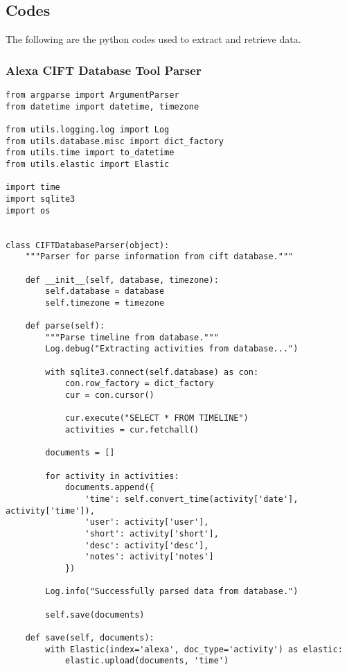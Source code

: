 \documentclass{easychair}
\begin{document}
\subsection{Codes}
The following are the python codes used to extract and retrieve data.
\subsubsection{Alexa CIFT Database Tool Parser}


\lstset{language=Python}
\lstset{frame=lines}
\lstset{basicstyle=\footnotesize}
\begin{lstlisting}
from argparse import ArgumentParser
from datetime import datetime, timezone

from utils.logging.log import Log
from utils.database.misc import dict_factory
from utils.time import to_datetime
from utils.elastic import Elastic

import time
import sqlite3
import os


class CIFTDatabaseParser(object):
    """Parser for parse information from cift database."""

    def __init__(self, database, timezone):
        self.database = database
        self.timezone = timezone

    def parse(self):
        """Parse timeline from database."""
        Log.debug("Extracting activities from database...")

        with sqlite3.connect(self.database) as con:
            con.row_factory = dict_factory
            cur = con.cursor()

            cur.execute("SELECT * FROM TIMELINE")
            activities = cur.fetchall()

        documents = []

        for activity in activities:
            documents.append({
                'time': self.convert_time(activity['date'], activity['time']),
                'user': activity['user'],
                'short': activity['short'],
                'desc': activity['desc'],
                'notes': activity['notes']
            })

        Log.info("Successfully parsed data from database.")

        self.save(documents)

    def save(self, documents):
        with Elastic(index='alexa', doc_type='activity') as elastic:
            elastic.upload(documents, 'time')


\end{lstlisting}
\end{document}

